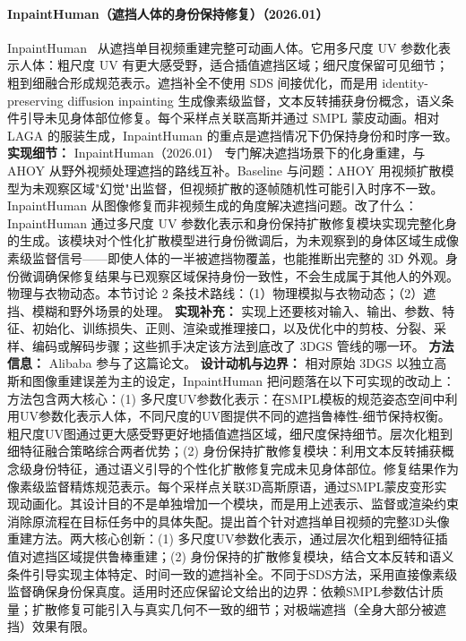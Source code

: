 \paragraph{InpaintHuman（遮挡人体的身份保持修复）（2026.01）}
InpaintHuman~\cite{2601_02098} 从遮挡单目视频重建完整可动画人体。它用多尺度 UV 参数化表示人体：粗尺度 UV 有更大感受野，适合插值遮挡区域；细尺度保留可见细节；粗到细融合形成规范表示。遮挡补全不使用 SDS 间接优化，而是用 identity-preserving diffusion inpainting 生成像素级监督，文本反转捕获身份概念，语义条件引导未见身体部位修复。每个采样点关联高斯并通过 SMPL 蒙皮动画。相对 LAGA 的服装生成，InpaintHuman 的重点是遮挡情况下仍保持身份和时序一致。
\textbf{实现细节：} InpaintHuman（2026.01） 专门解决遮挡场景下的化身重建，与 AHOY 从野外视频处理遮挡的路线互补。Baseline 与问题：AHOY 用视频扩散模型为未观察区域"幻觉"出监督，但视频扩散的逐帧随机性可能引入时序不一致。InpaintHuman 从图像修复而非视频生成的角度解决遮挡问题。改了什么：InpaintHuman 通过多尺度 UV 参数化表示和身份保持扩散修复模块实现完整化身的生成。该模块对个性化扩散模型进行身份微调后，为未观察到的身体区域生成像素级监督信号——即使人体的一半被遮挡物覆盖，也能推断出完整的 3D 外观。身份微调确保修复结果与已观察区域保持身份一致性，不会生成属于其他人的外观。物理与衣物动态。本节讨论 2 条技术路线：（1）物理模拟与衣物动态；（2）遮挡、模糊和野外场景的处理。
\textbf{实现补充：} 实现上还要核对输入、输出、参数、特征、初始化、训练损失、正则、渲染或推理接口，以及优化中的剪枝、分裂、采样、编码或解码步骤；这些抓手决定该方法到底改了 3DGS 管线的哪一环。
\textbf{方法信息：} Alibaba 参与了这篇论文。
\textbf{设计动机与边界：} 相对原始 3DGS 以独立高斯和图像重建误差为主的设定，InpaintHuman 把问题落在以下可实现的改动上：方法包含两大核心：(1) 多尺度UV参数化表示：在SMPL模板的规范姿态空间中利用UV参数化表示人体，不同尺度的UV图提供不同的遮挡鲁棒性-细节保持权衡。粗尺度UV图通过更大感受野更好地插值遮挡区域，细尺度保持细节。层次化粗到细特征融合策略综合两者优势；(2) 身份保持扩散修复模块：利用文本反转捕获概念级身份特征，通过语义引导的个性化扩散修复完成未见身体部位。修复结果作为像素级监督精炼规范表示。每个采样点关联3D高斯原语，通过SMPL蒙皮变形实现动画化。其设计目的不是单独增加一个模块，而是用上述表示、监督或渲染约束消除原流程在目标任务中的具体失配。提出首个针对遮挡单目视频的完整3D头像重建方法。两大核心创新：(1) 多尺度UV参数化表示，通过层次化粗到细特征插值对遮挡区域提供鲁棒重建；(2) 身份保持的扩散修复模块，结合文本反转和语义条件引导实现主体特定、时间一致的遮挡补全。不同于SDS方法，采用直接像素级监督确保身份保真度。适用时还应保留论文给出的边界：依赖SMPL参数估计质量；扩散修复可能引入与真实几何不一致的细节；对极端遮挡（全身大部分被遮挡）效果有限。
